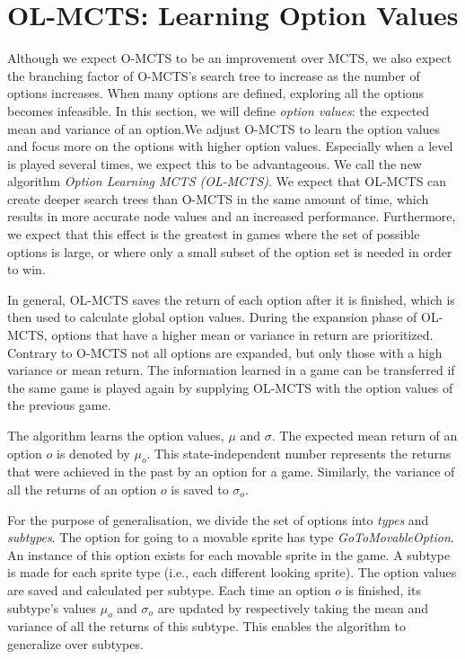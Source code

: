 \section{OL-MCTS: Learning Option Values} 
\label{sec:learning} 
Although we expect O-MCTS to be an improvement over MCTS, we also expect the
branching factor of O-MCTS's search tree to increase as the number of options
increases.  When many options are defined, exploring all the options becomes
infeasible. In this section, we will define \emph{option values}: the expected
mean and variance of an option.We adjust O-MCTS to learn the option values
and focus more on the options with higher option values. Especially when a level
is played several times, we expect this to be advantageous. We call the new
algorithm \emph{Option Learning MCTS (OL-MCTS)}. We expect that OL-MCTS can
create deeper search trees than O-MCTS in the same amount of time, which results
in more accurate node values and an increased performance. Furthermore, we
expect that this effect is the greatest in games where the set of possible
options is large, or where only a small subset of the option set is needed in
order to win.

In general, OL-MCTS saves the return of each option after it is finished, which
is then used to calculate global option values. During the expansion phase of
OL-MCTS, options that have a higher mean or variance in return are prioritized.
Contrary to O-MCTS not all options are expanded, but only those with a high
variance or mean return. The information learned in a game can be transferred if
the same game is played again by supplying OL-MCTS with the option values of the
previous game.

The algorithm learns the option values, $\mu$ and $\sigma$. The expected mean
return of an option $o$ is denoted by $\mu_o$. This state-independent number
represents the returns that were achieved in the past by an option for a game.
Similarly, the variance of all the returns of an option $o$ is saved to
$\sigma_o$.

For the purpose of generalisation, we divide the set of options into \emph{types}
and \emph{subtypes}. The option for going to a movable sprite has type
\emph{GoToMovableOption}. An instance of this option exists for each movable
sprite in the game. A subtype is made for each sprite type (i.e., each
different looking sprite). The option values are saved and calculated per
subtype. Each time an option $o$ is finished, its subtype's values $\mu_o$ and
$\sigma_o$ are updated by respectively taking the mean and variance of all the
returns of this subtype. This enables the algorithm to generalize over subtypes.

